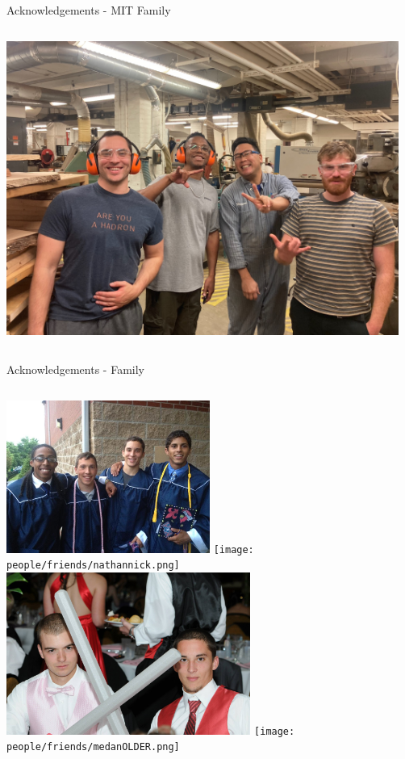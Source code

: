 \documentclass[aspectratio=169]{beamer}
\begin{document}
\begin{frame}{Acknowledgements - MIT Family }
\begin{columns}
                            
                \centering
                \includegraphics[width=0.965\textwidth]{people/people/hayami.jpg}
                    
                
    \end{columns}

\end{frame}


\begin{frame}{Acknowledgements - Family}
    \begin{columns}
            \centering
            \includegraphics[width=0.5\textwidth]{people/friends/grad.png}
            \texttt{[image: people/friends/nathannick.png]}
            \centering
            \includegraphics[width=0.6\textwidth]{people/friends/medan.png}
            \texttt{[image: people/friends/medanOLDER.png]}
    \end{columns}
    
\end{frame}
\end{document}
